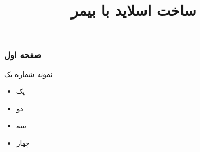\documentclass[12pt]{beamer}
\author{}
\title[آموزش لاتک]{\raggedleft ساخت اسلاید با بیمر}
\begin{document}
\frame{\maketitle}
\begin{frame}\raggedleft
\frametitle{صفحه اول}
نمونه شماره یک

    \begin{multicols}{2}
    \begin{itemize}\raggedleft
        \item یک
        \item دو
        \item سه
        \item چهار
    \end{itemize}
    \end{multicols}
\end{frame}
\end{document}
